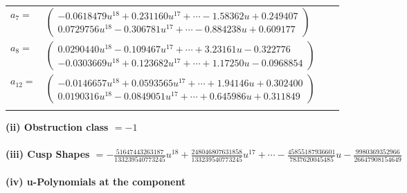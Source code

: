 \documentclass[1p]{elsarticle_modified}
\theoremstyle{definition}
\begin{document}
\begin{tabular}{m{7pt} m{180pt} m{7pt} m{180pt} }
\flushright $a_{7}=$&$\begin{pmatrix}-0.0618479 u^{18}+0.231160 u^{17}+\cdots-1.58362 u+0.249407\\0.0729756 u^{18}-0.306781 u^{17}+\cdots-0.884238 u+0.609177\end{pmatrix}$ \\
\flushright $a_{8}=$&$\begin{pmatrix}0.0290440 u^{18}-0.109467 u^{17}+\cdots+3.23161 u-0.322776\\-0.0303669 u^{18}+0.123682 u^{17}+\cdots+1.17250 u-0.0968854\end{pmatrix}$ \\
\flushright $a_{12}=$&$\begin{pmatrix}-0.0146657 u^{18}+0.0593565 u^{17}+\cdots+1.94146 u+0.302400\\0.0190316 u^{18}-0.0849051 u^{17}+\cdots+0.645986 u+0.311849\end{pmatrix}$\\&\end{tabular}
\flushleft \textbf{(ii) Obstruction class $= -1$}\\~\\
\flushleft \textbf{(iii) Cusp Shapes $= -\frac{51647443263187}{133239540773245} u^{18}+\frac{248046807631858}{133239540773245} u^{17}+\cdots-\frac{45855187936601}{7837620045485} u-\frac{9980369352966}{26647908154649}$}\\~\\
\newpage\renewcommand{\arraystretch}{1}
\flushleft \textbf{(iv) u-Polynomials at the component}\newline \\
\end{document}
